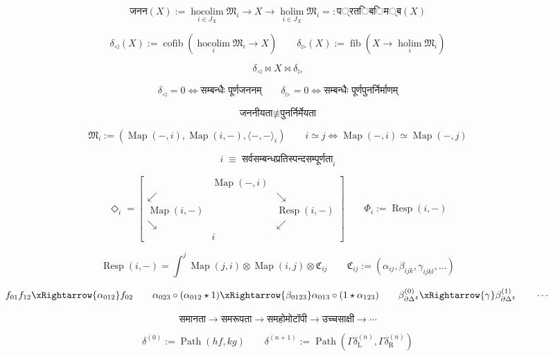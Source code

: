 \documentclass{article}
\begin{document}
\[
\boxed{
\mathsf{जनन}(X)
:=
\operatorname*{hocolim}_{i\in J_X}
\mathfrak M_i
\longrightarrow
X
\longrightarrow
\operatorname*{holim}_{i\in J_X}
\mathfrak M_i
=:
\mathsf{प्रतिबिम्ब}(X)
}
\]

\[
\delta_{\triangleleft}(X)
:=
\operatorname{cofib}
\left(
\operatorname*{hocolim}_{i}
\mathfrak M_i
\to
X
\right)
\qquad
\delta_{\triangleright}(X)
:=
\operatorname{fib}
\left(
X
\to
\operatorname*{holim}_{i}
\mathfrak M_i
\right)
\]

\[
\boxed{
\delta_{\triangleleft}
\bowtie
X
\bowtie
\delta_{\triangleright}
}
\]

\[
\delta_{\triangleleft}=0
\iff
\text{सम्बन्धैः पूर्णजननम्}
\qquad
\delta_{\triangleright}=0
\iff
\text{सम्बन्धैः पूर्णपुनर्निर्माणम्}
\]

\[
\boxed{
\text{जननीयता}
\not\equiv
\text{पुनर्निर्मेयता}
}
\]

\[
\mathfrak M_i
:=
\left(
\operatorname{Map}(-,i),
\operatorname{Map}(i,-),
\langle-,-\rangle_i
\right)
\qquad
i\simeq j
\iff
\operatorname{Map}(-,i)
\simeq
\operatorname{Map}(-,j)
\]

\[
\boxed{
i
\;\equiv\;
\text{सर्वसम्बन्धप्रतिस्पन्दसम्पूर्णता}_i
}
\]

\[
\Diamond_i
=
\left[
\begin{array}{ccc}
&
\operatorname{Map}(-,i)
&
\\
\swarrow&&\searrow
\\
\operatorname{Map}(i,-)
&&
\operatorname{Resp}(i,-)
\\
\searrow&&\swarrow
\\
&
i
&
\end{array}
\right]
\qquad
\boxed{
\Phi_i
:=
\operatorname{Resp}(i,-)
}
\]

\[
\operatorname{Resp}(i,-)
=
\int^{j}
\operatorname{Map}(j,i)
\otimes
\operatorname{Map}(i,j)
\otimes
\mathfrak C_{ij}
\qquad
\mathfrak C_{ij}
:=
\left(
\alpha_{ij},
\beta_{ijk},
\gamma_{ijkl},
\ldots
\right)
\]

\[
f_{01}f_{12}
\xRightarrow{\alpha_{012}}
f_{02}
\qquad
\alpha_{023}
\circ
(\alpha_{012}\star1)
\xRightarrow{\beta_{0123}}
\alpha_{013}
\circ
(1\star\alpha_{123})
\qquad
\beta_{\partial\Delta^4}^{(0)}
\xRightarrow{\gamma}
\beta_{\partial\Delta^4}^{(1)}
\qquad\cdots
\]

\[
\boxed{
\text{समानता}
\longrightarrow
\text{समरूपता}
\longrightarrow
\text{समहोमोटॉपी}
\longrightarrow
\text{उच्चसाक्षी}
\longrightarrow\cdots
}
\]

\[
\delta^{(0)}
:=
\operatorname{Path}(hf,kg)
\qquad
\delta^{(n+1)}
:=
\operatorname{Path}
\left(
\Gamma\delta^{(n)}_{\mathrm L},
\Gamma\delta^{(n)}_{\mathrm R}
\right)
\]
\end{document}

